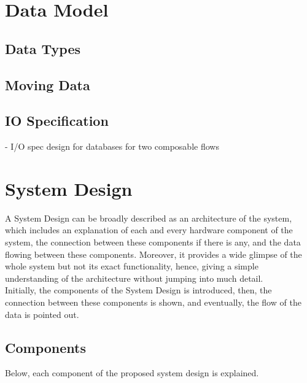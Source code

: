 \section{Data Model}

\subsection{Data Types}


\subsection{Moving Data}

\subsection{IO Specification}
- I/O spec design for databases for two composable flows


\section{System Design }
A System Design can be broadly described as an architecture of the system, which includes an explanation of each and every hardware component of the system, the connection between these components if there is any, and the data flowing between these components. Moreover, it provides a wide glimpse of the whole system but not its exact functionality, hence, giving a simple understanding of the architecture without jumping into much detail.\\
Initially, the components of the System Design is introduced, then, the connection between these components is shown, and eventually, the flow of the data is pointed out.

\subsection{Components}
\label{sub:components}
Below, each component of the proposed system design is explained.

